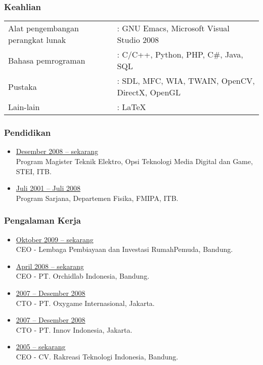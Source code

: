 \subsubsection*{Keahlian}
\begin{tabular}{p{5.4cm}l}
Alat pengembangan perangkat lunak & : GNU Emacs, Microsoft Visual Studio 2008\\
Bahasa pemrograman & : C/C++, Python, PHP, C\#, Java, SQL\\
Pustaka & :  SDL, MFC, WIA, TWAIN, OpenCV, DirectX, OpenGL\\
Lain-lain & : \LaTeX
\end{tabular}

\subsubsection*{Pendidikan}
\begin{itemize}
\item \underline{Desember 2008 -- sekarang}\\
Program Magister Teknik Elektro, Opsi Teknologi Media Digital dan Game, STEI, ITB.
\item \underline{Juli 2001 -- Juli 2008}\\
Program Sarjana, Departemen Fisika, FMIPA, ITB.\\
\end{itemize}

\subsubsection*{Pengalaman Kerja}
\begin{itemize}
\item \underline{Oktober 2009 -- sekarang}\\
CEO - Lembaga Pembiayaan dan Investasi RumahPemuda, Bandung.
\item \underline{April 2008 -- sekarang}\\
CEO - PT. Orchidlab Indonesia, Bandung.
\item \underline{2007 -- Desember 2008}\\
CTO - PT. Oxygame Internasional, Jakarta.
\item \underline{2007 -- Desember 2008}\\
CTO - PT. Innov Indonesia, Jakarta.
\item \underline{2005 -- sekarang}\\
CEO - CV. Rakreasi Teknologi Indonesia, Bandung.
\end{itemize}

